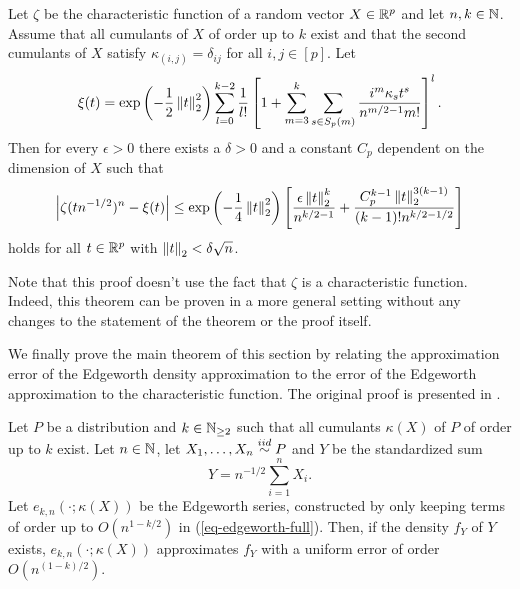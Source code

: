 \begin{theorem} \label{thm-edge-inv-tech}
    Let $\zeta$ be the characteristic function of a random vector $X \in {\mathbb{R}^p}$ and let $n, k \in \mathbb{N}$. Assume that all cumulants of $X$ of order up to $k$ exist and that the second cumulants of $X$ satisfy $\kappa_{(i, j)} = \delta_{ij}$ for all $i, j \in [p]$. Let
    \begin{equation} \label{eq-edgeworth-fourier}
        \xi(t) = \exp\left(-\frac{1}{2}\left\lVert t\right\rVert_2^2\right)\sum_{l=0}^{k-2} \frac{1}{l!} \left[ 1 + \sum_{m=3}^k \sum_{s \in S_p(m)} \frac{i^m\kappa_s t^s}{n^{m/2-1}m!} \right]^l.
    \end{equation}
    Then for every $\epsilon > 0$ there exists a $\delta > 0$ and a constant $C_p$ dependent on the dimension of $X$ such that 
    \begin{equation}\label{eq-edge-bound}
        \left|\zeta(t n^{-1/2})^n - \xi(t)\right| \leq \exp\left(-\frac{1}{4}\left\lVert t\right\rVert_2^2\right)\left[ \frac{\epsilon\left\lVert t\right\rVert_2^k}{n^{k/2-1}} + \frac{C_p^{k-1}\left\lVert t\right\rVert_2^{3(k-1)}}{(k-1)!n^{k/2-1/2}} \right]
    \end{equation}
    holds for all $t \in {\mathbb{R}^p}$ with $\left\lVert t\right\rVert_2 < \delta\sqrt{n}$.
\end{theorem}


Note that this proof doesn't use the fact that $\zeta$ is a characteristic function. Indeed, this theorem can be proven in a more general setting without any changes to the statement of the theorem or the proof itself.

We finally prove the main theorem of this section by relating the approximation error of the Edgeworth density approximation to the error of the Edgeworth approximation to the characteristic function. The original proof is presented in \cite[Theorem 3.5.1]{kolassa2006series}.

\begin{theorem} \label{thm-edgeworth}
    Let $P$ be a distribution and $k \in \mathbb{N}_{\geq 2}$ such that all cumulants $\kappa(X)$ of $P$ of order up to $k$ exist. Let $n \in \mathbb{N}$, let $X_1, \ldots, X_n \stackrel{iid}{\sim} P$ and $Y$ be the standardized sum
    \begin{equation*}
        Y = n^{-1/2}\sum_{i=1}^n X_i.
    \end{equation*}
    Let $e_{k, n}(\cdot; \kappa(X))$ be the Edgeworth series, constructed by only keeping terms of order up to $O(n^{1-k/2})$ in (\ref{eq-edgeworth-full}). Then, if the density $f_Y$ of $Y$ exists, $e_{k, n}(\cdot; \kappa(X))$ approximates $f_Y$ with a uniform error of order $O(n^{(1 - k)/2})$.
\end{theorem}
